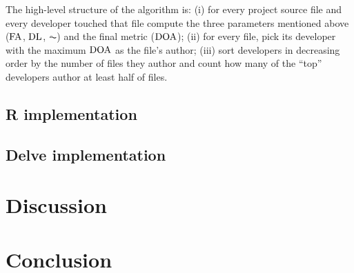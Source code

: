 The high-level structure of the algorithm is: (i) for every project 
source file and every developer touched that file compute the three 
parameters mentioned above ($\operatorname{FA}$, $\operatorname{DL}$, $\AC$) and the final metric ($\operatorname{DOA}$);
(ii) for every file, pick its developer with the maximum $\operatorname{DOA}$ as the file's
author; (iii) sort developers in decreasing order by the number of files 
they author and count how many of the ``top'' developers author at least
half of files.

\subsection{R implementation}

\subsection{Delve implementation}

\section {Discussion}

\section{Conclusion}
